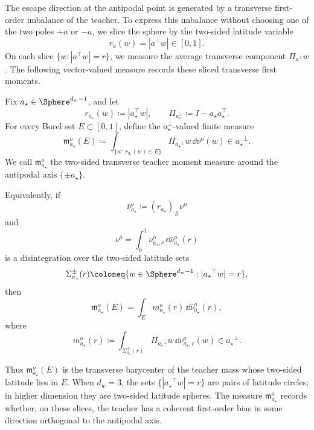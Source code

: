The escape direction at the antipodal point is generated by a transverse first-order imbalance of the teacher.  To express this imbalance without
choosing one of the two poles \(+a\) or \(-a\), we slice the sphere by the
two-sided latitude variable
\[
    r_a(w)=|a^\top w|\in[0,1].
\]
On each slice \(\{w:|a^\top w|=r\}\), we measure the average transverse
component \(\Pi_{a^\perp}w\).  The following vector-valued measure records
these sliced transverse first moments.
\begin{definition}
\label{def:two-sided-transverse-teacher-moment-measure}
Fix \(a_\star\in\Sphere^{d_w-1}\), and let
\[
    r_{a_\star}(w)\coloneq |a_\star^\top w|,
    \qquad
    \Pi_{a_\star^\perp}\coloneq I-a_\star a_\star^\top .
\]
For every Borel set \(E\subset[0,1]\), define the \(a_\star^\perp\)-valued finite
measure
\[
    \mathfrak m_{a_\star}^o(E)
    \coloneq
    \int_{\{w:\ r_{a_\star}(w)\in E\}}
    \Pi_{{a_\star}^\perp}w
    \,\dd\nu^o(w)
    \in {a_\star}^\perp .
\]
We call \(\mathfrak m_{a_\star}^o\) the two-sided transverse teacher moment measure
around the antipodal axis \(\{\pm {a_\star}\}\).

Equivalently, if
\[
    \bar\nu_{a_\star}^o\coloneq (r_{a_\star})_\#\nu^o
\]
and
\[
    \nu^o=\int_0^1\nu_{{a_\star},r}^o\,\dd\bar\nu_{a_\star}^o(r)
\]
is a disintegration over the two-sided latitude sets
\[
    \Sigma_{a_\star}^\pm(r)
    \coloneq
    \{w\in\Sphere^{d_w-1}: |{a_\star}^\top w|=r\},
\]
then
\[
    \mathfrak m_{a_\star}^o(E)
    =
    \int_E m_{a_\star}^o(r)\,\dd\bar\nu_{a_\star}^o(r),
\]
where
\[
    m_{a_\star}^o(r)
    \coloneq
    \int_{\Sigma_{a_\star}^\pm(r)}
    \Pi_{{a_\star}^\perp}w\,\dd\nu_{{a_\star},r}^o(w)
    \in {a_\star}^\perp .
\]
\end{definition}
Thus \(\mathfrak m_{a_\star}^o(E)\) is the transverse barycenter of the teacher mass whose two-sided latitude lies in \(E\).  When \(d_w=3\), the sets
\(\{|{a_\star}^\top w|=r\}\) are pairs of latitude circles; in higher dimension they are two-sided latitude spheres.  The measure \(\mathfrak m_{a_\star}^o\) records whether, on these slices, the teacher has a coherent first-order bias in some direction
orthogonal to the antipodal axis.


